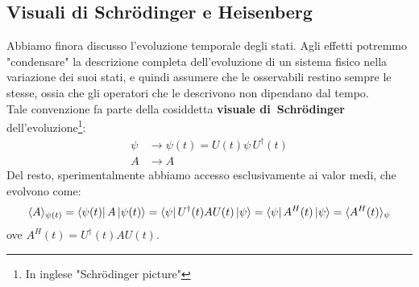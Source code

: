 \documentclass[../../FisicaTeorica.tex]{subfiles}
\begin{document}
\subsection{Visuali di Schrödinger e Heisenberg}
Abbiamo finora discusso l'evoluzione temporale degli stati. Agli effetti potremmo "condensare" la descrizione completa dell'evoluzione di un sistema fisico nella variazione dei suoi stati, e quindi assumere che le osservabili restino sempre le stesse, ossia che gli operatori che le descrivono non dipendano dal tempo.\\
Tale convenzione fa parte della cosiddetta \textbf{visuale di\ Schrödinger} dell'evoluzione\footnote{In inglese "Schrödinger picture"}:
\begin{align}
    \psi &\to \psi(t) = U(t)\psi\,U^\dag (t)
    \label{eqn:visuale_schrodinger}
    \\
    A &\to A\nonumber
\end{align}
Del resto, sperimentalmente abbiamo accesso esclusivamente ai valor medi, che evolvono come:
\begin{equation}
\langle A\rangle_{\psi(t)}=\bra{\psi(t)}A\ket{\psi(t)}=\bra{\psi}U^\dag(t)AU(t)\ket{\psi} = \bra{\psi}A^H(t)\ket{\psi} = \langle A^H(t)\rangle_\psi
\label{eqn:evoluzione_valor_medi}
\end{equation}
ove $A^H(t) = U^\dag(t)AU(t)$.\\
\end{document}

